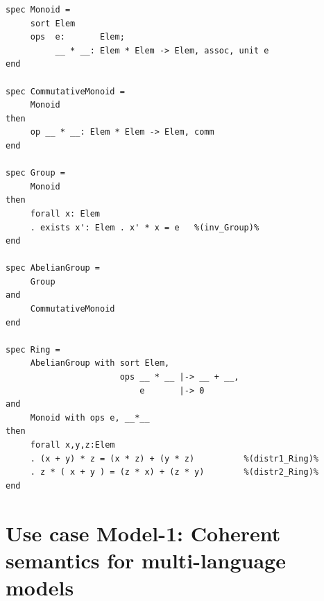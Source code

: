\documentclass[10pt,fleqn,%
\ifpretendfinal
final%
\else
draft%
\fi,
]{scrreprt}
\begin{document}
\begin{lstlisting}[basicstyle=\ttfamily\footnotesize,language=dolText,morekeywords={spec,props,ObjectProperty,Class,DisjointUnionOf,SubClassOf,Characteristics,Transitive,Asymmetric,SubPropertyOf,DisjointClasses,EquivalentTo,inverse,only,forall,iff,if,or,exists,bridge,distributed,from},escapechar=@,mathescape]	
spec Monoid =
     sort Elem
     ops  e:       Elem;
          __ * __: Elem * Elem -> Elem, assoc, unit e
end

spec CommutativeMonoid =
     Monoid
then
     op __ * __: Elem * Elem -> Elem, comm
end

spec Group =
     Monoid
then
     forall x: Elem
     . exists x': Elem . x' * x = e   %(inv_Group)%
end

spec AbelianGroup =
     Group
and
     CommutativeMonoid
end

spec Ring =
     AbelianGroup with sort Elem,
                       ops __ * __ |-> __ + __,
                           e       |-> 0
and
     Monoid with ops e, __*__
then
     forall x,y,z:Elem
     . (x + y) * z = (x * z) + (y * z)          %(distr1_Ring)%
     . z * ( x + y ) = (z * x) + (z * y)        %(distr2_Ring)%
end
\end{lstlisting}

\section{Use case Model-1: Coherent semantics for multi-language models}
	
\end{document}
